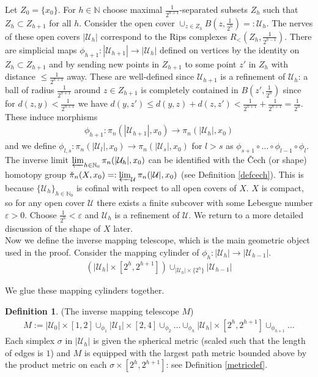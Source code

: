 \documentclass[a4paper,11pt]{article}
\theoremstyle{definition}
\newtheorem{definition}{Definition}[section]
\theoremstyle{plain}
\theoremstyle{remark}
\begin{document}
Let $Z_0 = \{x_0\}$. For $h\in \mathbb{N}$ choose maximal $\frac{1}{2^{h+1}}$-separated subsets $Z_h$ such that $Z_{h}\subset Z_{h+1}$ for all $h$. Consider the open cover $\cup_{z\in Z_h} B(z,\frac{1}{2^h})=: \mathcal{U}_{h}$. The nerves of these open covers $|\mathcal{U}_h|$ correspond to the Rips complexes $R_{<}(Z_h,\frac{1}{2^{h-1}})$. There are simplicial maps $\phi_{h+1}: |\mathcal{U}_{h+1}| \rightarrow |\mathcal{U}_{h}|$ defined on vertices by the identity on $Z_h\subset Z_{h+1}$ and by sending new points in $Z_{h+1}$ to some point $z'$ in $Z_h$ with distance $\leq \frac{1}{2^{h+1}}$ away. These are well-defined since $\mathcal{U}_{h+1}$ is a refinement of $\mathcal{U}_h$: a ball of radius $\frac{1}{2^{h+1}}$ around $z\in Z_{h+1}$ is completely contained in $B(z',\frac{1}{2^h})$ since for $d(z,y)<\frac{1}{2^{h+1}}$ we have $d(y,z')\leq d(y,z)+ d(z,z') < \frac{1}{2^{h+1}} +\frac{1}{2^{h+1}}= \frac{1}{2^{h}}$. These induce morphisms
\begin{align*}
\phi_{h+1}: \pi_{n} (|\mathcal{U}_{h+1}|,x_0)\rightarrow \pi_{n}(|\mathcal{U}_{h}|,x_0)
\end{align*}
and we define $\phi_{l,s}: \pi_{n} (|\mathcal{U}_{l}|,x_0)\rightarrow \pi_{n}(|\mathcal{U}_{s}|,x_0)$ for $l>s$ as $\phi_{s+1} \circ \dots \circ \phi_{l-1} \circ \phi_{l}$. The inverse limit $\varprojlim_{h\in \mathbb{N}_{0}}\pi_{n}(|\mathcal{U}_h|,x_0)$ can be identified with the \v{C}ech (or shape) homotopy group $\check{\pi}_n(X,x_0)=: \varprojlim_{\mathcal{U}}\pi_{n}(|\mathcal{U}|,x_0)$ (see Definition \ref{defcech}). This is because $\{\mathcal{U}_h\}_{h\in \mathbb{N}_0}$ is cofinal with respect to all open covers of $X$. $X$ is compact, so for any open cover $\mathcal{U}$ there exists a finite subcover with some Lebesgue number $\varepsilon>0$. Choose $\frac{1}{2^h}< \varepsilon$ and $\mathcal{U}_h$ is a refinement of $\mathcal{U}$. We return to a more detailed discussion of the shape of $X$ later. \\

Now we define the inverse mapping telescope, which is the main geometric object used in the proof. Consider the mapping cylinder of $\phi_{h}: |\mathcal{U}_{h}| \rightarrow |\mathcal{U}_{h-1}|$. 
\begin{align*}
(|\mathcal{U}_{h}| \times [2^{h},2^{h+1}]) \cup_{|\mathcal{U}_{h}| \times \{2^h\}} |\mathcal{U}_{h-1}| 
\end{align*}

We glue these mapping cylinders together. 

\begin{definition} (The inverse mapping telescope $M$) 
\begin{align*}
M:=|\mathcal{U}_0| \times [1,2] \cup_{\phi_1} |\mathcal{U}_1| \times [2,4] \cup_{\phi_2} \dots \cup_{\phi_h} |\mathcal{U}_h| \times [2^h,2^{h+1}] \cup_{\phi_{h+1}} \dots
\end{align*}
Each simplex $\sigma$ in $|\mathcal{U}_{h}|$ is given the spherical metric (scaled such that the length of edges is $1$) and $M$ is equipped with the largest path metric bounded above by the product metric on each $\sigma \times [2^h,2^{h+1}]$: see Definition \ref{metricdef}. 
\end{definition}
\end{document}
